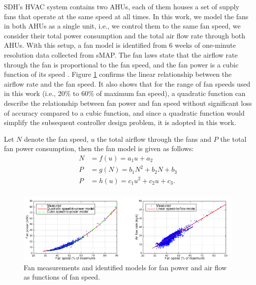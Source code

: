 SDH's HVAC system contains two AHUs, each of them houses a set of supply fans that operate at the same speed at all times.
In this work, we model the fans in both AHUs as a single unit, i.e., we control them to the same fan speed, we consider their total power consumption and the total air flow rate through both AHUs.
With this setup, a fan model is identified from 6 weeks of one-minute resolution data collected from sMAP.
The fan laws state that the airflow rate through the fan is proportional to the fan speed, and the fan power is a cubic function of its speed \cite{Hvac_book}. 
Figure \ref{fig:fan_model} confirms the linear relationship between the airflow rate and the fan speed.
It also shows that for the range of fan speeds used in this work (i.e., 20\% to 60\% of maximum fan speed), a quadratic function can describe the relationship between fan power and fan speed without significant loss of accuracy compared to a cubic function, and %
since a quadratic function would simplify the subsequent controller design problem, it is adopted in this work. 

Let $N$ denote the fan speed, $u$ the total airflow through the fans and $P$ the total fan power consumption, then the fan model is given as follows:
\begin{equation}\label{eq:fan_model}
\begin{aligned}
N & = f(u) = a_1 u + a_2\\
P & = g(N) = b_1 N^2 + b_2 N + b_3\\
P & = h(u) = c_1 u^2 + c_2 u + c_3.\\
\end{aligned}
\end{equation} 

\begin{figure}[h]
\centering
\vspace*{1cm}
\includegraphics[width=\textwidth]{chapters/building_exp/figures/fan_model.png}
\caption{Fan measurements and identified models for fan power and air flow as functions of fan speed.}
\label{fig:fan_model}
\vspace*{1cm}
\end{figure}









